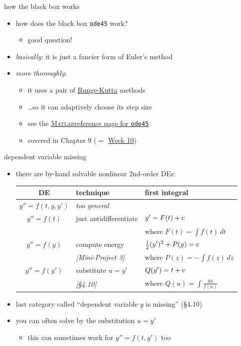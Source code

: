 \documentclass[dvipsnames,colorlinks]{beamer}
\newcommand{\Matlab}{\textsc{Matlab}}
\begin{document}
\begin{frame}{how the black box works}

\begin{itemize}
\item how does the black box \alert{\texttt{ode45}} work?
    \begin{itemize}
    \item good question!
    \end{itemize}
\item \emph{basically}:  it is just a fancier form of Euler's method
\item \emph{more thoroughly}:
    \begin{itemize}
    \item it uses a pair of \href{https://en.wikipedia.org/wiki/Runge_Kutta_methods}{Runge-Kutta} methods
    \item \dots so it can adaptively choose its step size
    \item see the \href{https://www.mathworks.com/help/matlab/ref/ode45.html}{\Matlab reference page for \texttt{ode45}}
    \item covered in Chapter 9 ($=$ \href{https://bueler.github.io/math302/week10.html}{Week 10})
    \end{itemize}
\end{itemize}
\end{frame}


\begin{frame}{dependent variable missing}

\begin{itemize}
\item there are by-hand solvable nonlinear 2nd-order DEs:

\bigskip
\small
\begin{tabular}{c|l|l}
DE & technique & first integral \\ \hline \hline
$y'' = f(t,y,y')$ & \emph{too general} &  \\ \hline
$y'' = f(t)$ & just antidifferentiate & $y' = F(t)+c \large\strut$ \\
& & where $F(t) = \int f(t)\,dt$ \\ \hline
$y'' = f(y)$ & compute energy & $\frac{1}{2} (y')^2 + P(y) = c \large\strut$\\
& \emph{[Mini-Project 3]} & where $P(z) = -\int f(z)\,dz$ \\ \hline
$y'' = f(y')$ & substitute $u=y'$ & $Q(y') = t + c \large\strut$\\
& \emph{[\S4.10]} & where $Q(u)=\int \frac{du}{f(u)}$
\end{tabular}

\normalsize

\bigskip
\item last category called ``dependent variable $y$ is missing'' (\S4.10)
\item you can often solve by the substitution $u=y'$
    \begin{itemize}
    \item this can sometimes work for $y'' = f(t,y')$ too
    \end{itemize}
\end{itemize}
\end{frame}
\end{document}
